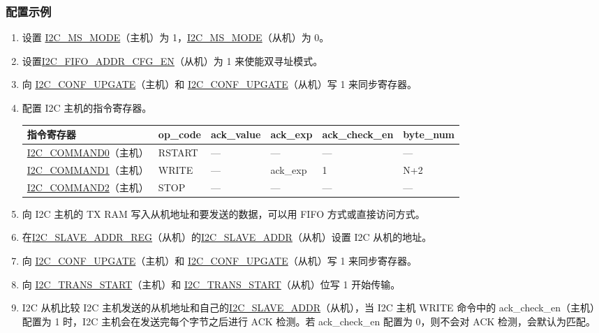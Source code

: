 \documentclass[main\_\_CN.tex]{subfiles}
\begin{document}
\subsubsection{配置示例}

\begin{enumerate}
\item 设置 \hyperref[fielddesc:I2CMSMODE]{I2C\_MS\_MODE}（主机）为 1，\hyperref[fielddesc:I2CMSMODE]{I2C\_MS\_MODE}（从机）为 0。
\item 设置\hyperref[fielddesc:I2CFIFOADDRCFGEN]{I2C\_FIFO\_ADDR\_CFG\_EN}（从机）为 1 来使能双寻址模式。
\item 向 \hyperref[fielddesc:I2CCONFUPGATE]{I2C\_CONF\_UPGATE}（主机）和 \hyperref[fielddesc:I2CCONFUPGATE]{I2C\_CONF\_UPGATE}（从机）写 1 来同步寄存器。
\item 配置 I2C 主机的指令寄存器。
\begin{longtable}{ | p{4cm} | p{2cm} | p{2cm} | p{2cm} |p{2.2cm} | p{1.8cm}|}
\hline\rowcolor{lightgray}
指令寄存器& op\_code & ack\_value&ack\_exp&ack\_check\_en&byte\_num  \\ \hline
\hyperref[fielddesc:I2CCOMMAND0]{I2C\_COMMAND0}（主机）& RSTART& ---&---&---&---  \\ \hline
\hyperref[fielddesc:I2CCOMMAND1]{I2C\_COMMAND1}（主机）& WRITE& ---&ack\_exp&1&N+2  \\ \hline
\hyperref[fielddesc:I2CCOMMAND2]{I2C\_COMMAND2}（主机）& STOP& ---&---&---&---  \\ \hline
\end{longtable}
\item 向 I2C 主机的 TX RAM 写入从机地址和要发送的数据，可以用 FIFO 方式或直接访问方式。
\item 在\hyperref[regdesc:I2CSLAVEADDRREG]{I2C\_SLAVE\_ADDR\_REG}（从机）的\hyperref[fielddesc:I2CSLAVEADDR]{I2C\_SLAVE\_ADDR}（从机）设置 I2C 从机的地址。
\item 向 \hyperref[fielddesc:I2CCONFUPGATE]{I2C\_CONF\_UPGATE}（主机）和 \hyperref[fielddesc:I2CCONFUPGATE]{I2C\_CONF\_UPGATE}（从机）写 1 来同步寄存器。
\item 向 \hyperref[fielddesc:I2CTRANSSTART]{I2C\_TRANS\_START}（主机）和 \hyperref[fielddesc:I2CTRANSSTART]{I2C\_TRANS\_START}（从机）位写 1 开始传输。
\item I2C 从机比较 I2C 主机发送的从机地址和自己的\hyperref[fielddesc:I2CSLAVEADDR]{I2C\_SLAVE\_ADDR}（从机），当 I2C 主机 WRITE 命令中的 ack\_check\_en（主机）配置为 1 时，I2C 主机会在发送完每个字节之后进行 ACK 检测。若 ack\_check\_en 配置为 0，则不会对 ACK 检测，会默认为匹配。

\end{enumerate}
\end{document}
